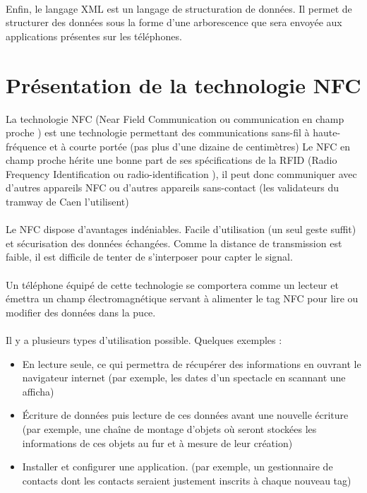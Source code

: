 \documentclass[a4paper,12pt,titlepage]{report}
\begin{document}
\paragraph*{}
Enfin, le langage XML est un langage de structuration de données. Il permet de structurer des données sous la forme d'une arborescence que sera envoyée aux applications présentes sur les téléphones.

\newpage

\section{Présentation de la technologie NFC}

La technologie NFC (\og Near Field Communication \fg{}  ou \og communication en champ proche \fg{}) est une technologie permettant des communications sans-fil à haute-fréquence et à courte portée (pas plus d'une dizaine de centimètres) Le NFC en champ proche hérite une bonne part de ses spécifications de la RFID (\og Radio Frequency Identification \fg{}  ou \og radio-identification \fg{} ), il peut donc communiquer avec d'autres appareils NFC ou d'autres appareils sans-contact (les validateurs du tramway de Caen l'utilisent)
\paragraph*{}

Le NFC dispose d'avantages indéniables. Facile d'utilisation (un seul geste suffit) et sécurisation des données échangées. Comme la distance de transmission est faible, il est difficile de tenter de s'interposer pour capter le signal.

\paragraph*{}

Un téléphone équipé de cette technologie se comportera comme un lecteur et émettra un champ électromagnétique servant à alimenter le tag NFC pour lire ou modifier des données dans la puce.

\paragraph*{}

Il y a plusieurs types d'utilisation possible. Quelques exemples :

\begin{itemize}
\item En lecture seule, ce qui permettra de récupérer des informations en ouvrant le navigateur internet (par exemple, les dates d'un spectacle en scannant une afficha)
\item Écriture de données puis lecture de ces données avant une nouvelle écriture (par exemple, une chaîne de montage d'objets où seront stockées les informations de ces objets au fur et à mesure de leur création)
\item Installer et configurer une application. (par exemple, un gestionnaire de contacts dont les contacts seraient justement inscrits à chaque nouveau tag)
\end{itemize}
\end{document}
